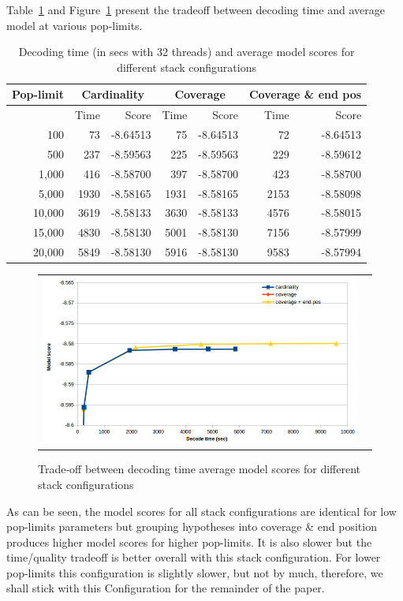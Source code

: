 \documentclass[11pt]{article}
\begin{document}
Table~\ref{tab:stack-configuration} and Figure~\ref{fig:stack-configuration} present the tradeoff between decoding time and average model at various pop-limits.
\begin{table}[t]
\small
\begin{center}
\begin{tabular}{|r|r|r|r|r|r|r|} \hline
Pop-limit	& \multicolumn{2}{c|}{Cardinality}	& \multicolumn{2}{c|}{Coverage}	& \multicolumn{2}{c|}{Coverage \& end pos} \\ \hline
		& Time		& Score			& Time		& Score		& Time		& Score	\\ \hline
100  		& 73		& -8.64513 		& 75		& -8.64513	& 72	& -8.64513 \\
500		& 237		& -8.59563		& 225		& -8.59563 	& 229	& -8.59612 \\
1,000	 	& 416		& -8.58700		& 397		& -8.58700	& 423	& -8.58700 \\ 
5,000 		& 1930		& -8.58165		& 1931		& -8.58165	& 2153	& -8.58098 \\ 
10,000 		& 3619		& -8.58133		& 3630		& -8.58133	& 4576	& -8.58015 \\ 
15,000 		& 4830		& -8.58130		& 5001		& -8.58130	& 7156	& -8.57999 \\ 
20,000 		& 5849		& -8.58130		& 5916		& -8.58130	& 9583	& -8.57994 \\ \hline
\end{tabular}
\end{center}
\caption{Decoding time (in secs with 32 threads) and average model scores for different stack configurations}
\label{tab:stack-configuration}
\end{table}

\begin{figure}[h]
\centering
\begin{tabular}{cc}
{\includegraphics[scale=0.4]{stack-configuration.png}} 
\end{tabular}
\caption{Trade-off between decoding time average model scores for different stack configurations}
\label{fig:stack-configuration}
\end{figure} 
As can be seen, the model scores for all stack configurations are identical for low pop-limits parameters but grouping hypotheses into coverage \& end position produces higher model scores for higher pop-limits. It is also slower but the time/quality tradeoff is better overall with this stack configuration. For lower pop-limits this configuration is slightly slower, but not by much, therefore, we shall stick with this Configuration for the remainder of the paper.
\end{document}
